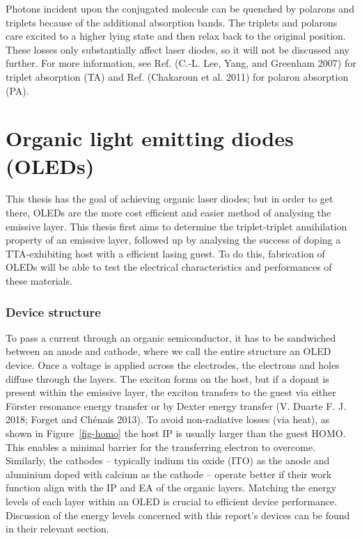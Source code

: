 \documentclass[
  letterpaper,
  DIV=11,
  numbers=noendperiod,
  oneside]{scrreprt}
\begin{document}
Photons incident upon the conjugated molecule can be quenched by
polarons and triplets because of the additional absorption bands. The
triplets and polarons care excited to a higher lying state and then
relax back to the original position. These losses only substantially
affect laser diodes, so it will not be discussed any further. For more
information, see Ref. (C.-L. Lee, Yang, and Greenham 2007) for triplet
absorption (TA) and Ref. (Chakaroun et al. 2011) for polaron absorption
(PA).

\hypertarget{sec-OLED}{%
\section{Organic light emitting diodes (OLEDs)}\label{sec-OLED}}

This thesis has the goal of achieving organic laser diodes; but in order
to get there, OLEDs are the more cost efficient and easier method of
analysing the emissive layer. This thesis first aims to determine the
triplet-triplet annihilation property of an emissive layer, followed up
by analysing the success of doping a TTA-exhibiting host with a
efficient lasing guest. To do this, fabrication of OLEDs will be able to
test the electrical characteristics and performances of these materials.

\hypertarget{device-structure}{%
\subsubsection{Device structure}\label{device-structure}}

To pass a current through an organic semiconductor, it has to be
sandwiched between an anode and cathode, where we call the entire
structure an OLED device. Once a voltage is applied across the
electrodes, the electrons and holes diffuse through the layers. The
exciton forms on the host, but if a dopant is present within the
emissive layer, the exciton transfers to the guest via either Förster
resonance energy transfer or by Dexter energy transfer (V. Duarte F. J.
2018; Forget and Chénais 2013). To avoid non-radiative losses (via
heat), as shown in Figure~\ref{fig-homo} the host IP is usually larger
than the guest HOMO. This enables a minimal barrier for the transferring
electron to overcome. Similarly, the cathodes -- typically indium tin
oxide (ITO) as the anode and aluminium doped with calcium as the cathode
-- operate better if their work function align with the IP and EA of the
organic layers. Matching the energy levels of each layer within an OLED
is crucial to efficient device performance. Discussion of the energy
levels concerned with this report's devices can be found in their
relevant section.\\
\end{document}
